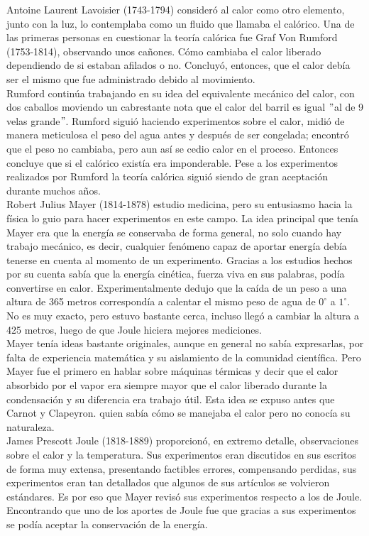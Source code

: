 Antoine Laurent Lavoisier (1743-1794) consideró al calor como otro elemento, junto con la luz, lo contemplaba como un fluido que llamaba el calórico. Una de las primeras personas en cuestionar la teoría calórica fue Graf Von Rumford (1753-1814), observando unos cañones.  Cómo cambiaba el calor liberado dependiendo de si estaban afilados o no. Concluyó, entonces, que el calor debía ser el mismo que fue administrado debido al movimiento.
\\
Rumford continúa trabajando en su idea del equivalente mecánico del calor, con dos caballos moviendo un cabrestante nota que el calor del barril es igual $"$al de 9 velas grande$"$. Rumford siguió haciendo experimentos sobre el calor, midió de manera meticulosa el peso del agua antes y después de ser congelada; encontró que el peso no cambiaba, pero aun así se cedio calor en el proceso. Entonces concluye que si el calórico existía era imponderable. Pese a los experimentos realizados por Rumford la teoría calórica siguió siendo de gran aceptación durante muchos años.  	
\\
Robert Julius Mayer (1814-1878) estudio medicina, pero su entusiasmo hacia la física lo guio para hacer experimentos en este campo. La idea principal que tenía Mayer era que la energía se conservaba de forma general, no solo cuando hay trabajo mecánico, es decir, cualquier fenómeno capaz de aportar energía debía tenerse en cuenta al momento de un experimento. Gracias a los estudios hechos por su cuenta sabía que la energía cinética, fuerza viva en sus palabras, podía convertirse en calor. Experimentalmente dedujo que la caída de un peso a una altura de 365 metros correspondía a calentar el mismo peso de agua de $0^{\circ}$ a $1^{\circ}$. No es muy exacto, pero estuvo bastante cerca, incluso llegó a cambiar la altura a 425 metros, luego de que Joule hiciera mejores mediciones.
\\
Mayer tenía ideas bastante originales, aunque en general no sabía expresarlas, por falta de experiencia matemática y su aislamiento de la comunidad científica. Pero Mayer fue el primero en hablar sobre máquinas térmicas y decir que el calor absorbido por el vapor era siempre mayor que el calor liberado durante la condensación y su diferencia era trabajo útil. Esta idea se expuso antes que Carnot y Clapeyron. quien  sabía cómo se manejaba el calor pero no conocía su naturaleza.
\\
James Prescott Joule (1818-1889) proporcionó, en extremo detalle, observaciones sobre el calor y la temperatura. Sus experimentos eran discutidos en sus escritos de forma muy extensa, presentando factibles errores, compensando perdidas, sus experimentos eran tan detallados que algunos de sus artículos se volvieron estándares. Es por eso que Mayer revisó sus experimentos respecto a los de Joule. Encontrando que uno de los aportes de Joule fue que gracias a sus experimentos se podía aceptar la conservación de la energía.

